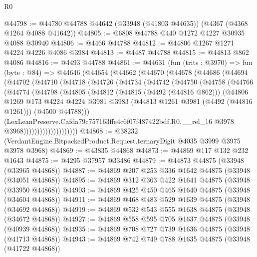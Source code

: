 \begin{lexlean}{R0}
\begin{coremodule}
@44798 := @44780 @44788 @44642 (@33948 (@41803 @44635)) (@4367 (@4368 @1264 @4088 @41642))
@44805 := @6808 @44788 @440 @1272 @4227 @30935 @4088 @30940
@44806 := @4466 @44788
@44812 := @44806 @1267 @1271 @4224 @4226 @4086 @3984
@44813 := @4487 @44788
@44815 := @44813 @862 @4086
@44816 := @4493 @44788
@44861 := @44631
    (fun (trits : @3970) =>
    fun (byte : @84) =>
    @44646
      (@44654
        (@44662
          (@44670
            (@44678
              (@44686
                (@44694
                  (@44702
                    (@44710
                      (@44718
                        (@44726
                          (@44734
                            (@44742
                              (@44750
                                (@44758
                                  (@44766
                                    (@44774
                                      (@44798
                                        (@44805
                                          (@44812
                                            (@44815 (@4492 (@44816 @862)))
                                            (@44806
                                              @1269
                                              @173
                                              @4224
                                              @4224
                                              @3981
                                              @3983
                                              (@44813 @1261 @3981 (@4492 (@44816 @1261)))
                                              (@4500 @44788)))
                                          (LexLeanPreserve.Cafda79c757163ffe4c6f07f487422bdf.R0.__rel_16
                                            @3978
                                            @3968))))))))))))))))))))
@44868 := @38232 (VerdantEngine.BitpackedProduct.Request.ternaryDigit @4035 @3999 @3975 @3978 @3968)
@44869 := @43835 @44868
@44873 := @44869 @117 @132 @232 @1643
@44875 := @4295 @37957 @33486
@44879 := @44873 @44875 (@33948 (@33965 @44868))
@44887 := @44869 @207 @253 @336 @1642 @44875 (@33948 (@34051 @44868))
@44895 := @44869 @312 @363 @422 @1641 @44875 (@33948 (@33950 @44868))
@44903 := @44869 @425 @450 @465 @1640 @44875 (@33948 (@34604 @44868))
@44911 := @44869 @468 @483 @529 @1639 @44875 (@33948 (@34692 @44868))
@44919 := @44869 @532 @543 @555 @1638 @44875 (@33948 (@34672 @44868))
@44927 := @44869 @558 @595 @705 @1637 @44875 (@33948 (@40939 @44868))
@44935 := @44869 @708 @727 @739 @1636 @44875 (@33948 (@41713 @44868))
@44943 := @44869 @742 @749 @788 @1635 @44875 (@33948 (@41722 @44868))

\end{coremodule}
\end{lexlean}
